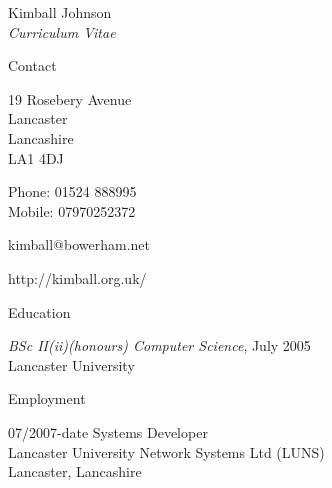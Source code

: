 \documentclass[10pt]{article}
\begin{document}
\newlength{\oldcvlabelwidth}
\renewcommand*{\cvbibname}{}

\begin{cv}{Kimball Johnson\\{\large \itshape Curriculum Vitae}}

\begin{cvlist}{Contact}
	\item
	19 Rosebery Avenue\\
	Lancaster\\
	Lancashire\\
	LA1 4DJ
	\item Phone: 01524 888995\\
	Mobile: 07970252372
	\item kimball@bowerham.net
	\item http://kimball.org.uk/
\end{cvlist}

\begin{cvlist}{Education}
	\item \emph{BSc II(ii)(honours) Computer Science}, July 2005\\
	Lancaster University
\end{cvlist}

\pagebreak

\begin{cvlist}{Employment}
	\item[07/2007-date] Systems Developer\\
	Lancaster University Network Systems Ltd (LUNS)\\
	Lancaster, Lancashire
\end{cvlist}

\setlength{\oldcvlabelwidth}{\cvlabelwidth}
\setlength{\cvlabelwidth}{1em}
\renewcommand*{\bibindent}{1.5em}
\renewcommand*{\biblabelsep}{1.5em}


\end{cv}
\end{document}
